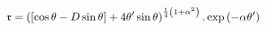 \begin{equation}
\frak{r}=\left( \left[ \cos \theta -D\sin \theta \right] +4\theta ^{\prime
}\sin \theta \right) ^{\frac{1}{4}\left( 1+\alpha ^{2}\right) }.\exp \left(
-\alpha \theta ^{\prime }\right)  \label{finalesolut}
\end{equation}

